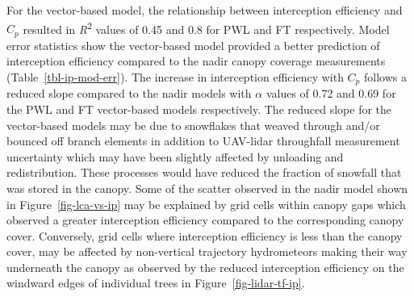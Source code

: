 \documentclass[
  letterpaper,
  DIV=11,
  numbers=noendperiod]{scrartcl}
\begin{document}
For the vector-based model, the relationship between interception
efficiency and \(C_p\) resulted in \emph{R}\textsuperscript{2} values of
0.45 and 0.8 for PWL and FT respectively. Model error statistics show
the vector-based model provided a better prediction of interception
efficiency compared to the nadir canopy coverage measurements
(Table~\ref{tbl-ip-mod-err}). The increase in interception efficiency
with \(C_p\) follows a reduced slope compared to the nadir models with
\(\alpha\) values of 0.72 and 0.69 for the PWL and FT vector-based
models respectively. The reduced slope for the vector-based models may
be due to snowflakes that weaved through and/or bounced off branch
elements in addition to UAV-lidar throughfall measurement uncertainty
which may have been slightly affected by unloading and redistribution.
These processes would have reduced the fraction of snowfall that was
stored in the canopy. Some of the scatter observed in the nadir model
shown in Figure~\ref{fig-lca-vs-ip} may be explained by grid cells
within canopy gaps which observed a greater interception efficiency
compared to the corresponding canopy cover. Conversely, grid cells where
interception efficiency is less than the canopy cover, may be affected
by non-vertical trajectory hydrometeors making their way underneath the
canopy as observed by the reduced interception efficiency on the
windward edges of individual trees in Figure~\ref{fig-lidar-tf-ip}.

\pagebreak
\end{document}
